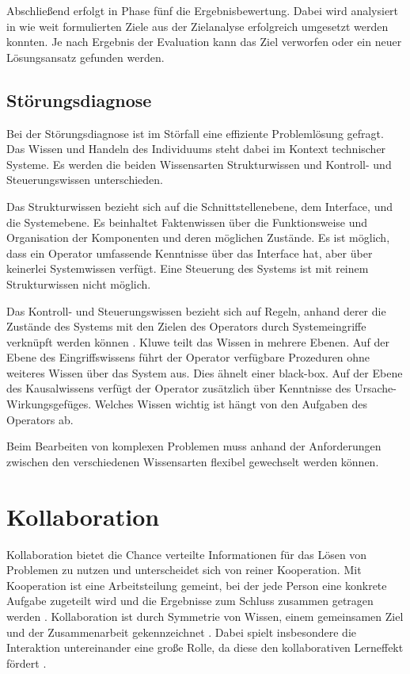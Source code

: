 Abschließend erfolgt in Phase fünf die Ergebnisbewertung. Dabei wird analysiert in wie weit formulierten Ziele aus der Zielanalyse erfolgreich umgesetzt werden konnten. Je nach Ergebnis der Evaluation kann das Ziel verworfen oder ein neuer Lösungsansatz gefunden werden.
\cite{Betsch2011}

\subsection{Störungsdiagnose}
\label{2-Störungsdiagnose}
Bei der Störungsdiagnose ist im Störfall eine effiziente Problemlösung gefragt. Das Wissen und Handeln des Individuums steht dabei im Kontext technischer Systeme. Es werden die beiden Wissensarten Strukturwissen und Kontroll- und Steuerungswissen unterschieden. \cite{Funke2015}

Das Strukturwissen bezieht sich auf die Schnittstellenebene, dem Interface, und die Systemebene. Es beinhaltet Faktenwissen über die Funktionsweise und Organisation der Komponenten und deren möglichen Zustände. Es ist möglich, dass ein Operator umfassende Kenntnisse über das Interface hat, aber über keinerlei Systemwissen verfügt. Eine Steuerung des Systems ist mit reinem Strukturwissen nicht möglich. \cite{Funke2015, Kluwe1997}

Das Kontroll- und Steuerungswissen bezieht sich auf Regeln, anhand derer die Zustände des Systems mit den Zielen des Operators durch Systemeingriffe verknüpft werden können \cite{Funke2015}. Kluwe \cite{Kluwe1997} teilt das Wissen in mehrere Ebenen. Auf der Ebene des Eingriffswissens führt der Operator verfügbare Prozeduren ohne weiteres Wissen über das System aus. Dies ähnelt einer black-box. Auf der Ebene des Kausalwissens verfügt der Operator zusätzlich über Kenntnisse des Ursache-Wirkungsgefüges. Welches Wissen wichtig ist hängt von den Aufgaben des Operators ab.

Beim Bearbeiten von komplexen Problemen muss anhand der Anforderungen zwischen den verschiedenen Wissensarten flexibel gewechselt werden können. \cite{Funke2015}

\section{Kollaboration}
Kollaboration bietet die Chance verteilte Informationen für das Lösen von Problemen zu nutzen und unterscheidet sich von reiner Kooperation. Mit Kooperation ist eine Arbeitsteilung gemeint, bei der jede Person eine konkrete Aufgabe zugeteilt wird und die Ergebnisse zum Schluss zusammen getragen werden \cite{Jermann2004}. Kollaboration ist durch Symmetrie von Wissen, einem gemeinsamen Ziel und der Zusammenarbeit gekennzeichnet \cite{Rummel1958}. Dabei spielt insbesondere die Interaktion untereinander eine große Rolle, da diese den kollaborativen Lerneffekt fördert \cite{Jermann2004}.

